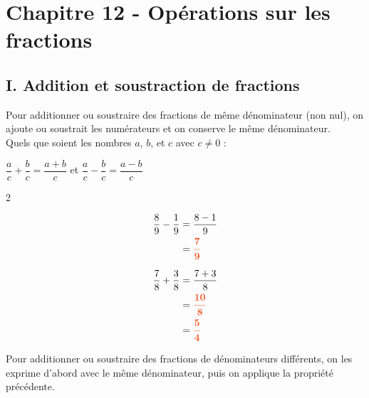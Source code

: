 \section*{Chapitre 12 - Opérations sur les fractions}

\subsection*{I. Addition et soustraction de fractions}

\vspace{0.3cm}
\begin{Propriété}
Pour additionner ou soustraire des fractions de même dénominateur (non nul), on ajoute ou soustrait les numérateurs et on conserve le même dénominateur. \\

Quels que soient les nombres $a$, $b$, et $c$ avec $c\neq 0$ : \\
\begin{center}
$ \dfrac{a}{c}+ \dfrac{b}{c}= \dfrac{a+b}{c}$ et $ \dfrac{a}{c} - \dfrac{b}{c} = \dfrac{a-b}{c} $
\end{center}
\end{Propriété}


\begin{Exemples}
\begin{multicols}{2}

$$\begin{aligned}\dfrac{8}{9} - \dfrac{1}{9} &= \dfrac{8-1}{9}\\
	&={\color[HTML]{F15929}\boldsymbol{\dfrac{7}{9}}}
	\end{aligned}$$

\columnbreak

$$\begin{aligned}\dfrac{7}{8} + \dfrac{3}{8}&= \dfrac{7+3}{8}\\
	&={\color[HTML]{F15929}\boldsymbol{\dfrac{10}{8}}}\\
	&={\color[HTML]{F15929}\boldsymbol{\dfrac{5}{4}}}
	\end{aligned}$$

\end{multicols}
\end{Exemples}


\begin{Méthode}
Pour additionner ou soustraire des fractions de dénominateurs différents, on les exprime d'abord avec le même dénominateur, puis on applique la propriété précédente.
\end{Méthode}

